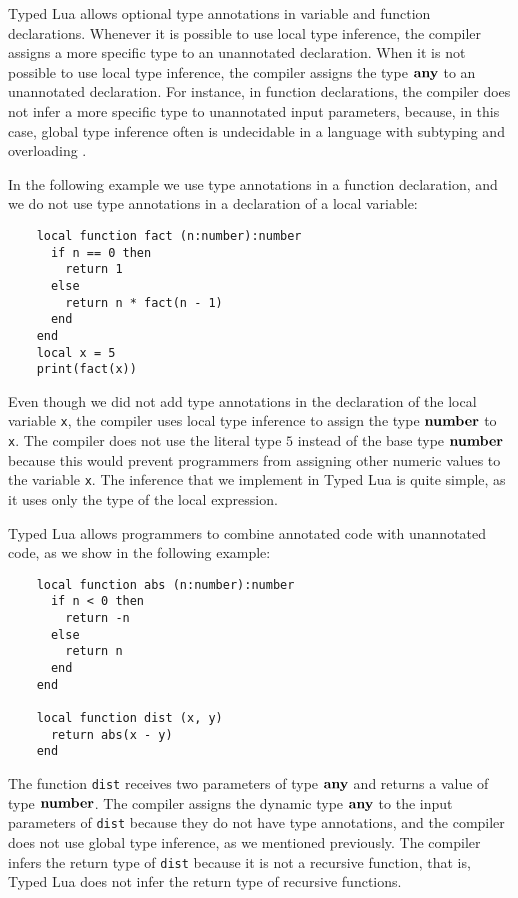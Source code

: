 Typed Lua allows optional type annotations in variable and function
declarations.
Whenever it is possible to use local type inference, the compiler
assigns a more specific type to an unannotated declaration.
When it is not possible to use local type inference, the compiler
assigns the type $\mathbf{any}$ to an unannotated declaration.
For instance, in function declarations, the compiler does not infer
a more specific type to unannotated input parameters, because,
in this case, global type inference often is undecidable in a
language with subtyping and overloading \citep{wells1999typability}.

In the following example we use type annotations in a function
declaration, and we do not use type annotations in a declaration of a
local variable:
\begin{verbatim}
    local function fact (n:number):number
      if n == 0 then
        return 1
      else
        return n * fact(n - 1)
      end
    end
    local x = 5
    print(fact(x))
\end{verbatim}

Even though we did not add type annotations in the declaration of
the local variable \texttt{x}, the compiler uses local type inference to
assign the type $\mathbf{number}$ to \texttt{x}.
The compiler does not use the literal type $5$ instead of the base
type $\mathbf{number}$ because this would prevent
programmers from assigning other numeric values to the variable
\texttt{x}.
The inference that we implement in Typed Lua is quite simple, as it
uses only the type of the local expression.

Typed Lua allows programmers to combine annotated code with
unannotated code, as we show in the following example:
\begin{verbatim}
    local function abs (n:number):number
      if n < 0 then
        return -n
      else
        return n
      end
    end

    local function dist (x, y)
      return abs(x - y)
    end
\end{verbatim}

The function \texttt{dist} receives two parameters of type $\mathbf{any}$
and returns a value of type $\mathbf{number}$.
The compiler assigns the dynamic type $\mathbf{any}$ to the input
parameters of \texttt{dist} because they do not have type annotations,
and the compiler does not use global type inference, as we mentioned
previously.
The compiler infers the return type of \texttt{dist} because it is
not a recursive function, that is, Typed Lua does not infer the return
type of recursive functions.

